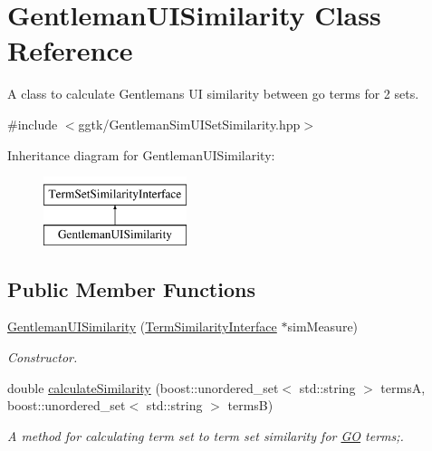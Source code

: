 \hypertarget{classGentlemanUISimilarity}{}\section{Gentleman\+U\+I\+Similarity Class Reference}
\label{classGentlemanUISimilarity}


A class to calculate Gentleman\textquotesingle{}s UI similarity between go terms for 2 sets.  




{\ttfamily \#include $<$ggtk/\+Gentleman\+Sim\+U\+I\+Set\+Similarity.\+hpp$>$}

Inheritance diagram for Gentleman\+U\+I\+Similarity\+:\begin{figure}[H]
\begin{center}
\leavevmode
\includegraphics[height=2.000000cm]{classGentlemanUISimilarity}
\end{center}
\end{figure}
\subsection*{Public Member Functions}
\begin{DoxyCompactItemize}
\item 
\hyperlink{classGentlemanUISimilarity_af6e913ef9fc584207a25dc732e6492b0}{Gentleman\+U\+I\+Similarity} (\hyperlink{classTermSimilarityInterface}{Term\+Similarity\+Interface} $\ast$sim\+Measure)
\begin{DoxyCompactList}\small\item\em Constructor. \end{DoxyCompactList}\item 
double \hyperlink{classGentlemanUISimilarity_adc95af100919a4c056ab1a45af09c1ac}{calculate\+Similarity} (boost\+::unordered\+\_\+set$<$ std\+::string $>$ termsA, boost\+::unordered\+\_\+set$<$ std\+::string $>$ termsB)
\begin{DoxyCompactList}\small\item\em A method for calculating term set to term set similarity for \hyperlink{namespaceGO}{GO} terms;. \end{DoxyCompactList}\end{DoxyCompactItemize}


